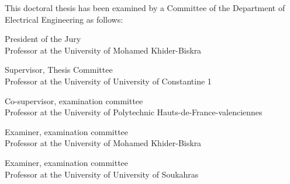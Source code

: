 %
%
%

\begin{titlepage}
\begin{large}
This doctoral thesis has been examined by a Committee of the Department
of Electrical Engineering as follows:

\signature{Pr. Mohamed Boumehraz
}{President of the Jury \\
   Professor at the University of Mohamed Khider-Biskra }
\signature{Pr. Abdelghani Chelihi}{Supervisor, Thesis Committee \\
   Professor at the University of University of Constantine 1}
\signature{Pr. Chouki Sentouh
}{Co-supervisor, examination committee \\
   Professor at the University of Polytechnic Hauts-de-France-valenciennes}
\signature{Pr. Achour Betka
}{Examiner, examination committee \\
  Professor at the University of Mohamed Khider-Biskra}
  \signature{Pr. Yahia Kourd
}{Examiner, examination committee \\
  Professor at the University of University of Soukahras}
\end{large}
\end{titlepage}


